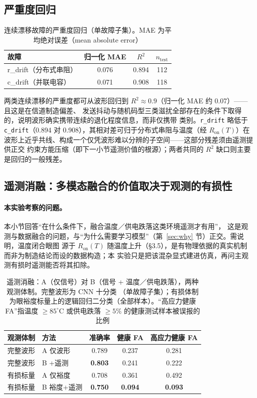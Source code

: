 \documentclass[11pt,a4paper,fontset=mac]{ctexart}
\begin{document}
\subsection{严重度回归}
\begin{table}[h]\centering\small
\caption{连续漂移故障的严重度回归（单故障子集）。MAE 为平均绝对误差（mean absolute error）}\label{tab:sev}
\begin{tabular}{@{}lccc@{}}
\toprule
故障 & 归一化 MAE & $R^2$ & $n_\text{test}$ \\
\midrule
r\_drift（分布式串阻） & 0.076 & 0.894 & 112 \\
c\_drift（并联电容） & 0.071 & 0.908 & 118 \\
\bottomrule
\end{tabular}
\end{table}

两类连续漂移的严重度都可从波形回归到 $R^2\approx0.9$（归一化 MAE 约 0.07）——且这是在信道制造偏差、
发送抖动与随机码型三类滋扰全部存在的条件下取得的，说明波形确实携带连续的退化程度信息，而非仅携带
类别。\texttt{r\_drift} 略低于 \texttt{c\_drift}（0.894 对 0.908），其相对差可归于分布式串阻与温度（经
$R_\text{on}(T)$）在波形上近乎共线、构成一个仅凭波形难以分辨的子空间——这部分残差须由遥测提供正交
约束方能压缩（即下一小节遥测价值的根源）；两者共同的 $R^2$ 缺口则主要是回归的一般残差。

\subsection{遥测消融：多模态融合的价值取决于观测的有损性}\label{sec:tele}
\paragraph{本实验考察的问题。} 本小节回答“在什么条件下，融合温度／供电跌落这类环境遥测才有用”，
这是观测与数据融合的问题，与“为什么需要学习模型”（第~\ref{sec:why} 节）正交。需说明，温度闭合眼图
源于 $R_\text{on}(T)$ 随温度上升（§3.5），是有物理依据的真实机制而非为制造结论而设的数据构造；本
实验只是把该混杂显式建进仿真，再问主观测有损时遥测能否将其扣除。

\begin{table}[h]\centering\small
\caption{遥测消融：A（仅信号）对 B（信号 + 温度／供电跌落），两种观测体制。完整波形为 CNN 十分类
（单故障子集）；有损体制为眼裕度标量上的逻辑回归二分类（全部样本）。“高应力健康 FA”指温度
$\geq85^\circ$C 或供电跌落 $\geq5\%$ 的健康测试样本被误报的比例}\label{tab:tele}
\begin{tabular}{@{}llccc@{}}
\toprule
观测体制 & 方法 & 准确率 & 健康 FA & 高应力健康 FA \\
\midrule
完整波形 & A 仅波形 & 0.789 & 0.237 & 0.281 \\
完整波形 & B +遥测 & \textbf{0.803} & 0.241 & 0.222 \\
有损标量 & A 仅裕度 & 0.708 & 0.361 & 0.492 \\
有损标量 & B 裕度+遥测 & \textbf{0.750} & \textbf{0.094} & \textbf{0.093} \\
\bottomrule
\end{tabular}
\end{table}
\end{document}
